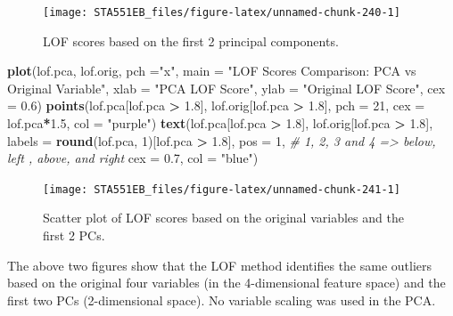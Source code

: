 \documentclass[
]{book}
\newenvironment{Shaded}{\begin{snugshade}}{\end{snugshade}}
\newcommand{\AttributeTok}[1]{\textcolor[rgb]{0.13,0.29,0.53}{#1}}
\newcommand{\CommentTok}[1]{\textcolor[rgb]{0.56,0.35,0.01}{\textit{#1}}}
\newcommand{\DecValTok}[1]{\textcolor[rgb]{0.00,0.00,0.81}{#1}}
\newcommand{\FloatTok}[1]{\textcolor[rgb]{0.00,0.00,0.81}{#1}}
\newcommand{\FunctionTok}[1]{\textcolor[rgb]{0.13,0.29,0.53}{\textbf{#1}}}
\newcommand{\NormalTok}[1]{#1}
\newcommand{\SpecialCharTok}[1]{\textcolor[rgb]{0.81,0.36,0.00}{\textbf{#1}}}
\newcommand{\StringTok}[1]{\textcolor[rgb]{0.31,0.60,0.02}{#1}}
\begin{document}
\begin{figure}

{\centering \texttt{[image: STA551EB\_files/figure-latex/unnamed-chunk-240-1]} 

}

\caption{LOF scores based on the first 2 principal components.}\label{fig:unnamed-chunk-240}
\end{figure}

\begin{Shaded}
\begin{Highlighting}[]
\FunctionTok{plot}\NormalTok{(lof.pca, lof.orig, }\AttributeTok{pch =}\StringTok{"x"}\NormalTok{, }
     \AttributeTok{main =} \StringTok{"LOF Scores Comparison: PCA vs Original Variable"}\NormalTok{,}
     \AttributeTok{xlab =} \StringTok{"PCA LOF Score"}\NormalTok{,}
     \AttributeTok{ylab =} \StringTok{"Original LOF Score"}\NormalTok{,}
     \AttributeTok{cex =} \FloatTok{0.6}\NormalTok{)}
\FunctionTok{points}\NormalTok{(lof.pca[lof.pca }\SpecialCharTok{\textgreater{}} \FloatTok{1.8}\NormalTok{], lof.orig[lof.pca }\SpecialCharTok{\textgreater{}} \FloatTok{1.8}\NormalTok{],}
       \AttributeTok{pch =} \DecValTok{21}\NormalTok{, }
       \AttributeTok{cex =}\NormalTok{ lof.pca}\SpecialCharTok{*}\FloatTok{1.5}\NormalTok{,}
       \AttributeTok{col =} \StringTok{"purple"}\NormalTok{)}
\FunctionTok{text}\NormalTok{(lof.pca[lof.pca }\SpecialCharTok{\textgreater{}} \FloatTok{1.8}\NormalTok{], lof.orig[lof.pca }\SpecialCharTok{\textgreater{}} \FloatTok{1.8}\NormalTok{], }
     \AttributeTok{labels =} \FunctionTok{round}\NormalTok{(lof.pca, }\DecValTok{1}\NormalTok{)[lof.pca }\SpecialCharTok{\textgreater{}} \FloatTok{1.8}\NormalTok{], }
     \AttributeTok{pos =} \DecValTok{1}\NormalTok{,   }\CommentTok{\# 1, 2, 3 and 4 =\textgreater{} below, left , above, and right }
     \AttributeTok{cex =} \FloatTok{0.7}\NormalTok{,}
     \AttributeTok{col =} \StringTok{"blue"}\NormalTok{)}
\end{Highlighting}
\end{Shaded}

\begin{figure}

{\centering \texttt{[image: STA551EB\_files/figure-latex/unnamed-chunk-241-1]} 

}

\caption{Scatter plot of LOF scores based on the original variables and the first 2 PCs.}\label{fig:unnamed-chunk-241}
\end{figure}

The above two figures show that the LOF method identifies the same outliers based on the original four variables (in the 4-dimensional feature space) and the first two PCs (2-dimensional space). No variable scaling was used in the PCA.
\end{document}
